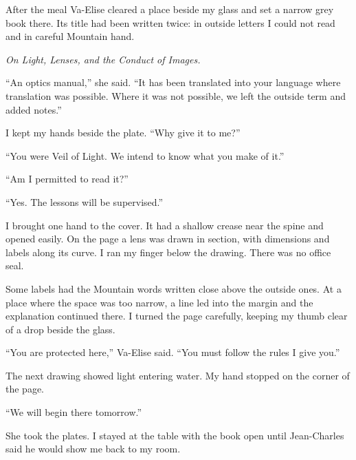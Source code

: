 After the meal Va-Elise cleared a place beside my glass and set a narrow grey book there. Its title had been written twice: in outside letters I could not read and in careful Mountain hand.\par

\textit{On Light, Lenses, and the Conduct of Images.}\par

``An optics manual,'' she said. ``It has been translated into your language where translation was possible. Where it was not possible, we left the outside term and added notes.''\par

I kept my hands beside the plate. ``Why give it to me?''\par

``You were Veil of Light. We intend to know what you make of it.''\par

``Am I permitted to read it?''\par

``Yes. The lessons will be supervised.''\par

I brought one hand to the cover. It had a shallow crease near the spine and opened easily. On the page a lens was drawn in section, with dimensions and labels along its curve. I ran my finger below the drawing. There was no office seal.\par

Some labels had the Mountain words written close above the outside ones. At a place where the space was too narrow, a line led into the margin and the explanation continued there. I turned the page carefully, keeping my thumb clear of a drop beside the glass.\par

``You are protected here,'' Va-Elise said. ``You must follow the rules I give you.''\par

The next drawing showed light entering water. My hand stopped on the corner of the page.\par

``We will begin there tomorrow.''\par

She took the plates. I stayed at the table with the book open until Jean-Charles said he would show me back to my room.\par

\ornament

